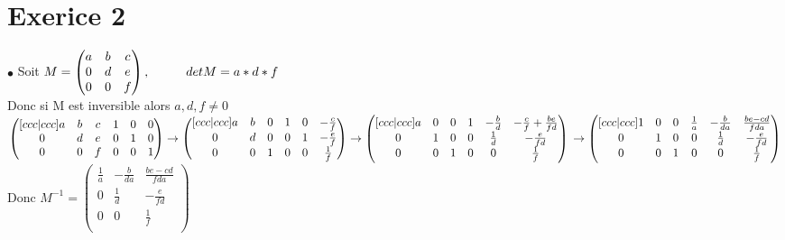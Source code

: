 \documentclass{article}
\author{Frederic Becerril}
\newcommand\tab[1][1cm]{\hspace*{#1}}
\begin{document}
\part*{Exerice 2}

$\bullet$ Soit $M = \begin{pmatrix}
    a & b & c\\
    0 & d & e\\
    0 & 0 & f\\
\end{pmatrix}, \tab det M = a * d * f$ \vspace*{5mm} \\
Donc si M est inversible alors $a, d, f \neq 0$ \vspace*{5mm}\\
$\begin{pmatrix}[ccc|ccc]
    a & b & c & 1 & 0 & 0\\
    0 & d & e & 0 & 1 & 0\\
    0 & 0 & f & 0 & 0 & 1\\
\end{pmatrix} \rightarrow \begin{pmatrix}[ccc|ccc]
    a & b & 0 & 1 & 0 & -\frac{c}{f}\\
    0 & d & 0 & 0 & 1 & -\frac{e}{f}\\
    0 & 0 & 1 & 0 & 0 & \frac{1}{f}\\
\end{pmatrix} \rightarrow \begin{pmatrix}[ccc|ccc]
    a & 0 & 0 & 1 & -\frac{b}{d} & -\frac{c}{f} + \frac{be}{fd}\\
    0 & 1 & 0 & 0 & \frac{1}{d} & -\frac{e}{fd}\\
    0 & 0 & 1 & 0 & 0 & \frac{1}{f}\\
\end{pmatrix}\vspace*{5mm} \\ \rightarrow \begin{pmatrix}[ccc|ccc]
    1 & 0 & 0 & \frac{1}{a} & -\frac{b}{da} & \frac{be - cd}{fda}\\
    0 & 1 & 0 & 0 & \frac{1}{d} & -\frac{e}{fd}\\
    0 & 0 & 1 & 0 & 0 & \frac{1}{f}\\
\end{pmatrix}$ \vspace*{5mm}\\
Donc $M^{-1} = \begin{pmatrix}
    \frac{1}{a} & -\frac{b}{da} & \frac{be - cd}{fda}\\
    0 & \frac{1}{d} & -\frac{e}{fd}\\
    0 & 0 & \frac{1}{f}\\
\end{pmatrix}$\\
\end{document}
